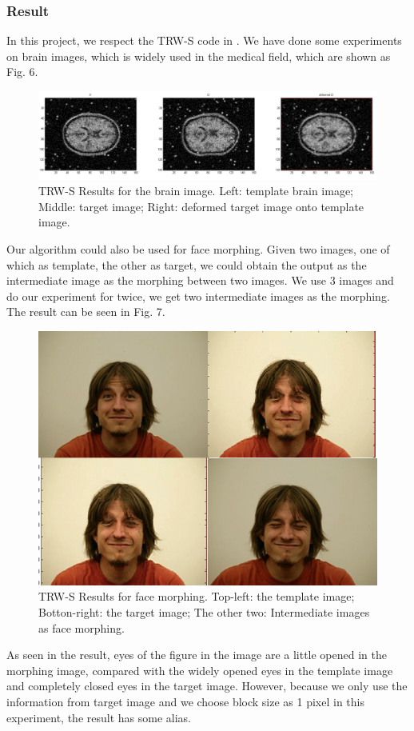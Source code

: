 \documentclass{article} %
\begin{document}
		\subsubsection{Result}
        In this project, we respect the TRW-S code in \cite{shekhovtsov2008efficient}. 
        We have done some experiments on brain images, which is widely used in the medical field, which are shown as Fig. 6.
        \begin{figure}[!ht]
        \centering
        \includegraphics[scale=0.25]{showBrain.jpg}
        \caption{TRW-S Results for the brain image. Left: template brain image; Middle: target image; Right: deformed target image onto template image.}
        \end{figure}
        Our algorithm could also be used for face morphing. Given two images, one of which as template, the other as target, we could obtain the output as the intermediate image as the morphing between two images. We use 3 images and do our experiment for twice, we get two intermediate images as the morphing. The result can be seen in Fig. 7.
        \begin{figure}[!ht]
        \centering
        \includegraphics[scale=0.5]{faceMorph.jpg}
        \caption{TRW-S Results for face morphing. Top-left: the template image; Botton-right: the target image; The other two: Intermediate images as face morphing.}
        \end{figure}
        As seen in the result, eyes of the figure in the image are a little opened in the morphing image, compared with the widely opened eyes in the template image and completely closed eyes in the target image. However, because we only use the information from target image and we choose block size as 1 pixel in this experiment, the result has some alias.
\end{document}
